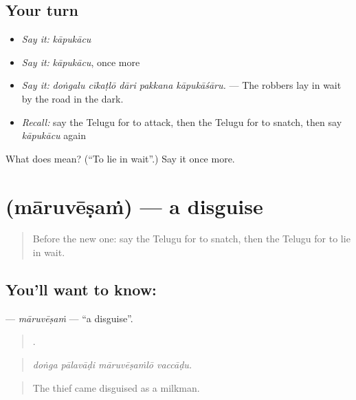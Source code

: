 \subsection*{Your turn}
\begin{itemize}
\raggedright
  \item \emph{Say it:} \emph{kāpukācu}
  \item \emph{Say it:} \emph{kāpukācu}, once more
  \item \emph{Say it:} \emph{doṅgalu cīkaṭlō dāri pakkana kāpukāśāru.} — The robbers lay in wait by the road in the dark.
  \item \emph{Recall:} say the Telugu for to attack, then the Telugu for to snatch, then say \emph{kāpukācu} again
\end{itemize}

\begin{tcolorbox}[breakable,colback=teal!4,colframe=teal!35!black,title={Before you move on}]
What does  mean? (\textquotedblleft{}To lie in wait\textquotedblright{}.) Say it once more.
\end{tcolorbox}
\section[\texorpdfstring{\te{మారువేషం} (māruvēṣaṁ)}{మారువేషం (māruvēṣaṁ)}]{ (māruvēṣaṁ) — a disguise}

\label{lesson:TE-C348-maruvesam}



\begin{quote}
Before the new one: say the Telugu for to snatch, then the Telugu for to lie in wait.
\end{quote}

\subsection*{You'll want to know: }
\textbf{} — \emph{māruvēṣaṁ} — \textquotedblleft{}a disguise\textquotedblright{}.

\begin{quote}
   .
\end{quote}

\begin{quote}
\emph{doṅga pālavāḍi māruvēṣaṁlō vaccāḍu.}
\end{quote}

\begin{quote}
The thief came disguised as a milkman.
\end{quote}

